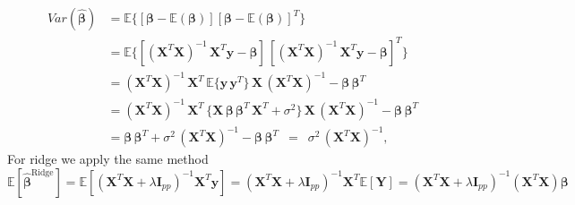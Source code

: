 \documentclass[twoside,11pt]{report}
\begin{document}
\begin{align*}
Var(\mathbf{\hat{\beta}}) & = \mathbb{E} \{ [\mathbf{\beta} - \mathbb{E}(\mathbf{\beta})] [\mathbf{\beta} - \mathbb{E}(\mathbf{\beta})]^{T} \}
\\
& = \mathbb{E} \{ [(\mathbf{X}^{T} \mathbf{X})^{-1} \, \mathbf{X}^{T} \mathbf{y} - \mathbf{\beta}] \, [(\mathbf{X}^{T} \mathbf{X})^{-1} \, \mathbf{X}^{T} \mathbf{y} - \mathbf{\beta}]^{T} \}
\\
& = (\mathbf{X}^{T} \mathbf{X})^{-1} \, \mathbf{X}^{T} \, \mathbb{E} \{ \mathbf{y} \, \mathbf{y}^{T} \} \, \mathbf{X} \, (\mathbf{X}^{T} \mathbf{X})^{-1} - \mathbf{\beta} \, \mathbf{\beta}^{T}
\\
& = (\mathbf{X}^{T} \mathbf{X})^{-1} \, \mathbf{X}^{T} \, \{ \mathbf{X} \, \mathbf{\beta} \, \mathbf{\beta}^{T} \,  \mathbf{X}^{T} + \sigma^2 \} \, \mathbf{X} \, (\mathbf{X}^{T} \mathbf{X})^{-1} - \mathbf{\beta} \, \mathbf{\beta}^{T}
\\
& = \mathbf{\beta} \, \mathbf{\beta}^{T}  + \sigma^2 \, (\mathbf{X}^{T} \mathbf{X})^{-1} - \mathbf{\beta} \, \mathbf{\beta}^{T}
\, \, \, = \, \, \, \sigma^2 \, (\mathbf{X}^{T} \mathbf{X})^{-1},
\end{align*}
For ridge we apply the same method
$$
\mathbb{E}[\mathbf{\hat{\beta}}^{\mathrm{Ridge}}] = \mathbb{E}\left[ \left(\mathbf{X}^T\mathbf{X}+\lambda\mathbf{I}_{pp}\right)^{-1}\mathbf{X}^T\mathbf{y}\right]=\left(\mathbf{X}^T\mathbf{X}+\lambda\mathbf{I}_{pp}\right)^{-1}\mathbf{X}^T \mathbb{E}[ \mathbf{Y}]=\left(\mathbf{X}^T\mathbf{X}+\lambda\mathbf{I}_{pp}\right)^{-1}\left(\mathbf{X}^T  \mathbf{X}\right)\mathbf{\beta}
$$
\end{document}
